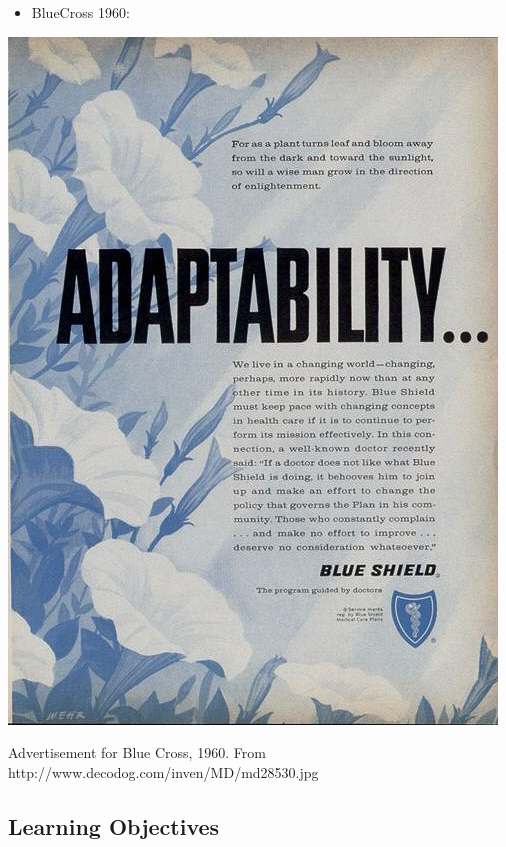 \begin{refsection}
\begin{itemize}
\item BlueCross 1960:

\end{itemize}

\begin{marginfigure}
 \begin{center}


     \includegraphics[scale=0.25]{../images/md28530.jpg}
\end{center}
 \caption{Advertisement for Blue Cross, 1960. From http://www.decodog.com/inven/MD/md28530.jpg }
\label{fig: BlueCross}
\end{marginfigure}


\newpage

\subsection{Learning Objectives}
\label{learningobjectives}


\end{refsection}
